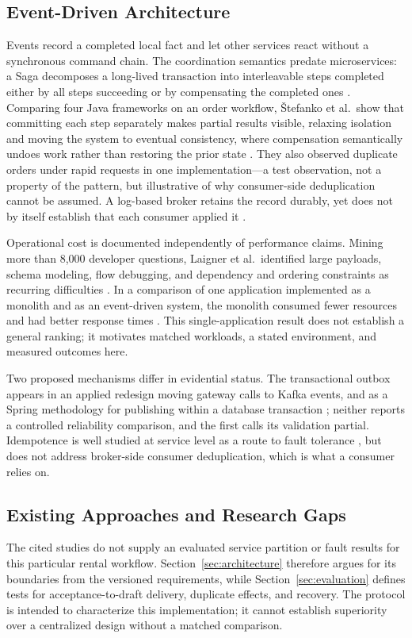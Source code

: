 \subsection{Event-Driven Architecture}
Events record a completed local fact and let other services react without a synchronous command chain. The coordination semantics predate microservices: a Saga decomposes a long-lived transaction into interleavable steps completed either by all steps succeeding or by compensating the completed ones \cite{garciamolina1987sagas}. Comparing four Java frameworks on an order workflow, \v{S}tefanko et al.\ show that committing each step separately makes partial results visible, relaxing isolation and moving the system to eventual consistency, where compensation semantically undoes work rather than restoring the prior state \cite{stefanko2019saga}. They also observed duplicate orders under rapid requests in one implementation---a test observation, not a property of the pattern, but illustrative of why consumer-side deduplication cannot be assumed. A log-based broker retains the record durably, yet does not by itself establish that each consumer applied it \cite{kleppmann2017designing}.

Operational cost is documented independently of performance claims. Mining more than 8,000 developer questions, Laigner et al.\ identified large payloads, schema modeling, flow debugging, and dependency and ordering constraints as recurring difficulties \cite{laigner2026eventmanagement}. In a comparison of one application implemented as a monolith and as an event-driven system, the monolith consumed fewer resources and had better response times \cite{cabane2024edaperformance}. This single-application result does not establish a general ranking; it motivates matched workloads, a stated environment, and measured outcomes here.

Two proposed mechanisms differ in evidential status. The transactional outbox appears in an applied redesign moving gateway calls to Kafka events, and as a Spring methodology for publishing within a database transaction \cite{peliza2025outbox,glybovets2024transactions}; neither reports a controlled reliability comparison, and the first calls its validation partial. Idempotence is well studied at service level as a route to fault tolerance \cite{ramalingam2013idempotence}, but does not address broker-side consumer deduplication, which is what a consumer relies on.

\subsection{Existing Approaches and Research Gaps}
The cited studies do not supply an evaluated service partition or fault results for this particular rental workflow. Section~\ref{sec:architecture} therefore argues for its boundaries from the versioned requirements, while Section~\ref{sec:evaluation} defines tests for acceptance-to-draft delivery, duplicate effects, and recovery. The protocol is intended to characterize this implementation; it cannot establish superiority over a centralized design without a matched comparison.


